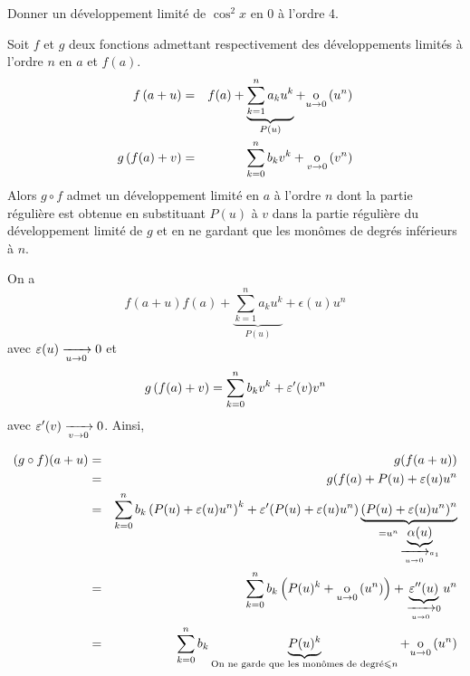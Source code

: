 \documentclass{magnoliaold}
\begin{document}
\begin{exoUnique}
\exo Donner un développement limité de $\cos^2 x$ en 0 à l'ordre 4.
\end{exoUnique}



\begin{proposition}[utile=-3]
Soit $f$ et $g$ deux fonctions admettant respectivement des développements
limités à l'ordre $n$ en $a$ et $f(a)$.
\begin{eqnarray*}
f\left(a+u\right)&=&f(a)+\underbrace{\sum_{k=1}^n a_k u^k}_{P(u)}+\underset{u \rightarrow 0}{\text{o}}\left(u^n\right)\\
g\left(f(a)+v\right)&=&\sum_{k=0}^n b_k v^k+\underset{v \rightarrow 0}{\text{o}}\left(v^n\right)
\end{eqnarray*}
Alors $g\circ f$ admet un développement limité en $a$ à l'ordre $n$
dont la partie régulière est obtenue en substituant $P(u)$ à $v$ dans la partie
régulière du développement limité de $g$ et en ne gardant que les monômes de
degrés inférieurs à $n$.
\end{proposition}

\begin{preuve}
On a $$f(a+u)f(a)+\underbrace{\sum_{k=1}^n a_k u^k}_{P(u)}+\epsilon(u)u^n$$ avec $\varepsilon(u)\xrightarrow[u\rightarrow 0]{}{0}$ et 
$$g\left(f(a)+v\right)=\sum_{k=0}^n b_k v^k+\varepsilon'(v)v^n$$ avec $\varepsilon'(v)\xrightarrow[v\rightarrow 0]{}{0}$.
Ainsi,

\begin{eqnarray*}
(g\circ f)(a+u)&=&g(f(a+u))\\
&=&g(f(a)+P(u)+\varepsilon(u)u^n\\
&=&\sum_{k=0}^n b_k \left(P(u)+\varepsilon(u)u^n\right)^k+\varepsilon'(P(u)+\varepsilon(u)u^n)\underbrace{\left(P(u)+\varepsilon(u)u^n\right)^n}_{=u^n\underbrace{\alpha(u)}_{\xrightarrow[u\rightarrow 0]{}{a_1}}}\\
&=&\sum_{k=0}^n b_k\left(P(u)^k+\underset{u \rightarrow 0}{\text{o}}\left(u^n\right)\right)+\underbrace{\varepsilon''(u)}_{\xrightarrow[u\rightarrow 0]{}{0}}u^n\\
&=&\sum_{k=0}^n b_k\underbrace{P(u)^k}_{\text{On ne garde que les monômes de degré}\leqslant n}+\underset{u \rightarrow 0}{\text{o}}\left(u^n\right)
\end{eqnarray*}

\end{preuve}
\end{document}
